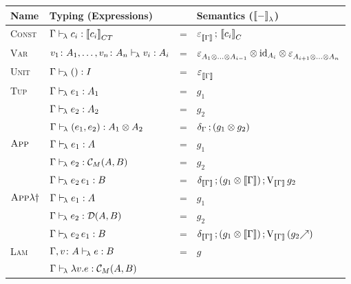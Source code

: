 \documentclass[runningheads,envcountsame]{llncs}
\newcommand{\monad}{M}
\newcommand{\homCM}[3][]{\homJ{#2}{\C_\monad}{#3}}
\begin{document}
\begin{figure}
    \centering
    {\def\arraystretch{1.5}
    \begin{tabular}{l|l c l}
        \hline
        Name & Typing (Expressions) & & Semantics ($\semL{-}$)
        \\ \hline\hline
          \textsc{Const} 
        & $\typerulel{\Gamma}{c_i}{\sem{c_i}_{CT}}$
        & = & $\comp{\terminal_{\sem{\Gamma}}}{\sem{c_i}_C}$
        \\ \hline
          \textsc{Var}
        & $v_1\colon A_1, \dots, v_n\colon A_n \vdash_{\!\lambda} v_i : A_i$
        & = & $\tensor{\terminal_{\tensor{A_1}{\tensor{\dots}{A_{i-1}}}}}{\tensor{\id_{A_i}}{\terminal_{\tensor{\tensor{A_{i+1}}{\dots}}{A_n}}}}$
        \\ \hline
          \textsc{Unit} 
        & $\Gamma \vdash_{\!\lambda} () : I$
        & = & $\terminal_{\sem{\Gamma}}$
        \\ \hline
          \multirow{3}{*}{\textsc{Tup}}
        & $\Gamma \vdash_{\!\lambda} e_1 : A_1$
        & = & $g_1$ \\
        & $\Gamma \vdash_{\!\lambda} e_2 : A_2$
        & = & $g_2$ \\ \cline{2-2}
        & $\typerulel{\Gamma}{\epair{e_1}{e_2}}{\tensor{A_1}{A_2}}$
        & = & $\comp{\dup_{\Gamma}}{(\tensor{g_1}{g_2})}$
        \\ \hline
          \multirow{3}{*}{$\textsc{App}$}
        & $\Gamma \vdash_{\!\lambda} e_1 : A$
        & = & $g_1$ \\
        & $\typerulel{\Gamma}{e_2}{\homCM{A}{B}}$
        & = & $g_2$ \\ \cline{2-2}
        & $\Gamma \vdash_{\!\lambda} e_2\,e_1 : B$
        & = & $\comp{\comp{\dup_{\sem{\Gamma}}}{(\tensor{g_1}{\sem{\Gamma}})}}{\uncurry_{\sem{\Gamma}}\,g_2}$
        \\ \hline
          \multirow{3}{*}{$\textsc{App}\lambda\dagger$}
        & $\Gamma \vdash_{\!\lambda} e_1 : A$
        & = & $g_1$ \\
        & $\Gamma \vdash_{\!\lambda} e_2 : \mathcal{D}(A, B)$
        & = & $g_2$ \\ \cline{2-2}
        & $\Gamma \vdash_{\!\lambda} e_2\,e_1 : B$
        & = & $\comp{\comp{\dup_{\sem{\Gamma}}}{(\tensor{g_1}{\sem{\Gamma}})}}{\uncurry_{\sem{\Gamma}}\,(\f{g_2})}$
        \\ \hline
          \multirow{2}{*}{\textsc{Lam}}
        & $\Gamma, v\colon A \vdash_{\!\lambda} e : B$
        & = & $g$ \\ \cline{2-2}
        & $\typerulel{\Gamma}{\elam{v}{e}}{\homCM{A}{B}}$

\end{tabular}}
\end{figure}
\end{document}
